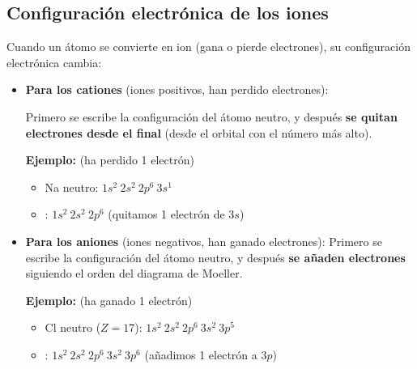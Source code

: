 \subsection{Configuración electrónica de los iones}
Cuando un átomo se convierte en ion (gana o pierde electrones), su configuración electrónica cambia:
\begin{itemize}
    \item \textbf{Para los cationes} (iones positivos, han perdido electrones):

    Primero se escribe la configuración del átomo neutro, y después \textbf{se quitan electrones desde el final} (desde el orbital con el número más alto).

    \textbf{Ejemplo:}  (ha perdido 1 electrón)
    \begin{itemize}
        \item Na neutro: \( 1s^2\ 2s^2\ 2p^6\ 3s^1 \)
        \item {}: \( 1s^2\ 2s^2\ 2p^6 \) (quitamos 1 electrón de \( 3s \))
    \end{itemize}

    \item \textbf{Para los aniones} (iones negativos, han ganado electrones):
    Primero se escribe la configuración del átomo neutro, y después \textbf{se añaden electrones} siguiendo el orden del diagrama de Moeller.

    \textbf{Ejemplo:}  (ha ganado 1 electrón)
    \begin{itemize}
        \item Cl neutro (\( Z = 17 \)): \( 1s^2\ 2s^2\ 2p^6\ 3s^2\ 3p^5 \)
        \item {}: \( 1s^2\ 2s^2\ 2p^6\ 3s^2\ 3p^6 \) (añadimos 1 electrón a \( 3p \))
    \end{itemize}
\end{itemize}
